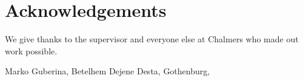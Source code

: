 \thispagestyle{plain}			%
\section*{Acknowledgements}
We give thanks to the supervisor and everyone else at Chalmers who made out work possible.

\vspace{1.5cm}
\hfill
Marko Guberina, Betelhem Dejene Desta, Gothenburg, \monthname \space \the\year

\newpage				%
\thispagestyle{empty}
\mbox{}
